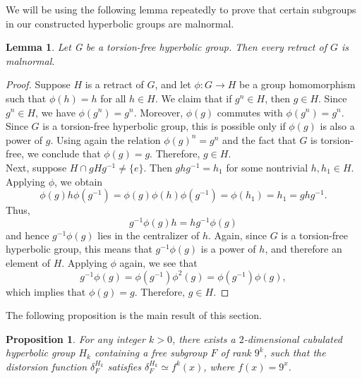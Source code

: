 \documentclass[oneside,11pt,reqno]{amsart}
\newtheorem{prop}[thm]{Proposition}
\newtheorem{lem}[thm]{Lemma}
\theoremstyle{definition}
\begin{document}
We will be using the following lemma repeatedly to prove that certain subgroups in our constructed hyperbolic groups are malnormal. 

\begin{lem}\label{retract}
Let G be a torsion-free hyperbolic group. Then every retract of $G$ is malnormal.
\end{lem}
\begin{proof}
    Suppose $H$ is a retract of $G$, and let $\phi: G \longrightarrow H$ be a group homomorphism such that $\phi(h)=h$ for all $h \in H$. We claim that if $g^n \in H$, then $g \in H$. Since $g^n \in H$, we have $\phi(g^n)=g^n$. Moreover, $\phi(g)$ commutes with $\phi(g^n)=g^n$. Since $G$ is a torsion-free hyperbolic group, this is possible only if $\phi(g)$ is also a power of $g$. Using again the relation $\phi(g)^n=g^n$ and the fact that $G$ is torsion-free, we conclude that $\phi(g)=g$. Therefore, $g \in H$.
    \\
    Next, suppose $H \cap gHg^{-1} \neq \{e\}$. Then $ghg^{-1}=h_1$ for some nontrivial $h, h_1 \in H$. Applying $\phi$, we obtain  $$\phi(g)h\phi(g^{-1})=\phi(g)\phi(h)\phi(g^{-1})=\phi(h_1)=h_1=ghg^{-1}.$$ Thus, $$g^{-1}\phi(g)h = h g^{-1} \phi(g)$$ and hence $g^{-1}\phi(g)$ lies in the centralizer of $h$. Again, since $G$ is a torsion-free hyperbolic group, this means that $g^{-1} \phi(g)$ is a power of $h$, and therefore an element of $H$. Applying $\phi$ again, we see that
    $$g^{-1} \phi(g)= \phi(g^{-1}) \phi^2(g)= \phi(g^{-1}) \phi(g),$$  which implies that $\phi(g) =g$. Therefore, $g \in H$.
   
\end{proof} 

The following proposition is the main result of this section.

\begin{prop}\label{itrexp}
For any integer $k > 0$, there exists a $2$-dimensional cubulated hyperbolic group $H_k$ containing a free subgroup $F$ of rank $9^k$, such that the distorsion function $\delta_F^{H_k}$ satisfies $\delta_F^{H_k} \simeq f^k(x)$, where $f(x)=9^x$.
\end{prop}
\end{document}
